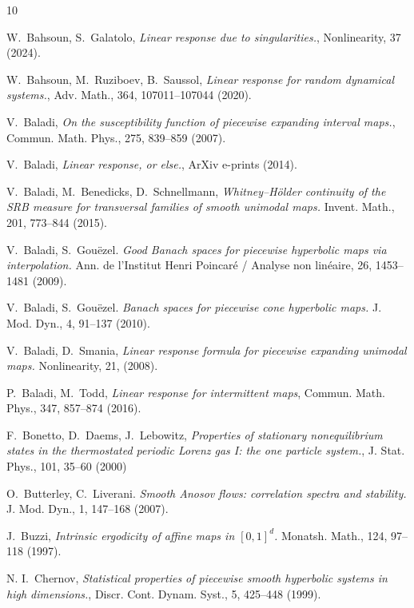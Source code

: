 \documentclass{amsart}
\numberwithin{equation}{section}
\begin{document}
\begin{thebibliography}{10}



 W.~Bahsoun, S.~Galatolo, \emph{Linear response due to singularities.}, Nonlinearity, 37 (2024).

 W.~Bahsoun, M.~Ruziboev, B.~Saussol, \emph{Linear response for random dynamical systems.}, Adv. Math., 364,  107011--107044 (2020).

 V.~Baladi, \emph{On the susceptibility function of piecewise expanding interval maps.}, Commun. Math. Phys., 275, 839--859 (2007).

 V.~Baladi, \emph{Linear response, or else.}, ArXiv e-prints (2014).

 V.~Baladi, M.~Benedicks, D.~Schnellmann, \emph{Whitney–Hölder continuity of the SRB measure for transversal families of smooth unimodal maps.} Invent. Math., 201, 773--844 (2015).


 V.~Baladi, S.~Gouëzel. \emph{Good Banach spaces for piecewise hyperbolic maps via interpolation.}  Ann. de l'Institut Henri Poincaré / Analyse non linéaire, 26, 1453--1481 (2009).

 V.~Baladi, S.~Gouëzel. \emph{Banach spaces for piecewise cone hyperbolic maps.} J. Mod. Dyn., 4, 91--137 (2010).


 V.~Baladi, D.~Smania, \emph{Linear response formula for piecewise expanding unimodal maps.} Nonlinearity, 21, (2008).

 P.~Baladi, M.~Todd, \emph{Linear response for intermittent maps}, Commun. Math. Phys., 347, 857--874 (2016).


 F.~Bonetto, D.~Daems, J.~Lebowitz, \emph{Properties of stationary nonequilibrium states
in the thermostated periodic Lorenz gas I: the one particle system.}, J. Stat. Phys., 101, 35--60 (2000)

 O.~Butterley, C.~Liverani. \emph{Smooth Anosov flows: correlation spectra and stability.} J. Mod. Dyn., 1, 147--168 (2007).


 J.~Buzzi, \emph{Intrinsic ergodicity of affine maps in \([0, 1]^d\).} Monatsh. Math., 124,  97--118 (1997).


N. I.~Chernov, \emph{Statistical properties of piecewise smooth hyperbolic systems in high dimensions.}, Discr. Cont. Dynam. Syst., 5, 425--448 (1999).


\end{thebibliography}
\end{document}

